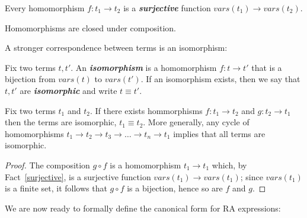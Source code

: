 \begin{fact}\label{surjective}
Every homomorphism $f : t_1 \rightarrow t_2$ is a \emph{\textbf{surjective}} function $vars(t_1) \rightarrow vars(t_2)$.
\end{fact}
\begin{fact}\label{compose}
  Homomorphisms are closed under composition.
\end{fact}
A stronger correspondence between terms is an isomorphism:
\begin{defn}
  Fix two terms $t, t'$.  An \emph{\textbf{isomorphism}} is a homomorphism $f : t \rightarrow t'$ that is a bijection from $vars(t)$ to $vars(t')$.  If an isomorphism exists, then we say that $t, t'$ are \emph{\textbf{isomorphic}} and write $t \equiv t'$.
\end{defn}

\begin{lmm}\label{homocycle}
  Fix two terms $t_1$ and $t_2$.  If there exists hommorphisms $f : t_1 \rightarrow t_2$ and $g: t_2 \rightarrow t_1$ then the terms are isomorphic, $t_1 \equiv t_2$.  More generally, any cycle of homomorphisms $t_1 \rightarrow t_2 \rightarrow t_3 \rightarrow \ldots \rightarrow t_n \rightarrow t_1$ implies that all terms are isomorphic.
\end{lmm}{}
\begin{proof}
  The composition $g \circ f$ is a homomorphism $t_1 \rightarrow t_1$ which, by Fact~\ref{surjective}, is a surjective function $vars(t_1) \rightarrow vars(t_1)$; since $vars(t_1)$ is a finite set, it follows that $g \circ f$ is a bijection, hence so are $f$ and $g$.
\end{proof}{}
We are now ready to formally define the canonical form for RA expressions: 

